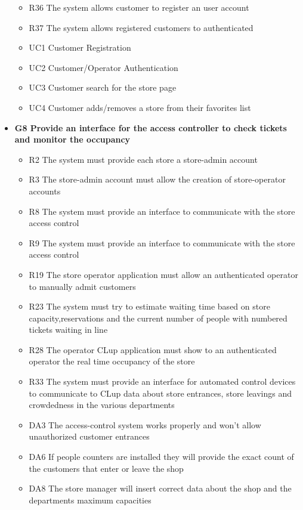 \begin{itemize}
\begin{itemize}
        \item R36 The system allows customer to register an user account
        \item R37 The system allows registered customers to authenticated
        \medskip
        \medskip
        \item UC1 Customer Registration
        \item UC2 Customer/Operator Authentication
        \item UC3 Customer search for the store page
        \item UC4 Customer adds/removes a store from their favorites list 
    \end{itemize}                                                
    \item \textbf{G8 Provide an interface for the access controller to check tickets and monitor the occupancy }
    \begin{itemize}
        \item R2 The system must provide each store a store-admin account
        \item R3 The store-admin account must allow the creation of store-operator accounts
        \item R8 The system must provide an interface to communicate with the store access control
        \item R9 The system must provide an interface to communicate with the store access control
        \item R19 The store operator application must allow an authenticated operator to manually admit customers
        \item R23 The system must try to estimate waiting time based on store capacity,reservations and the current number of people with numbered tickets waiting in line
        \item R28 The operator CLup application must show to an authenticated operator the real time occupancy of the store
        \item R33 The system must provide an interface for automated control devices to communicate to CLup data about store entrances, store leavings and crowdedness in the various departments
        \medskip
        \item DA3 The access-control system works properly and won’t allow unauthorized customer entrances
        \item DA6 If people counters are installed they will provide the exact count of the customers that enter or leave the shop
        \item DA8 The store manager will insert correct data about the shop and the departments maximum capacities

\end{itemize}
\end{itemize}
